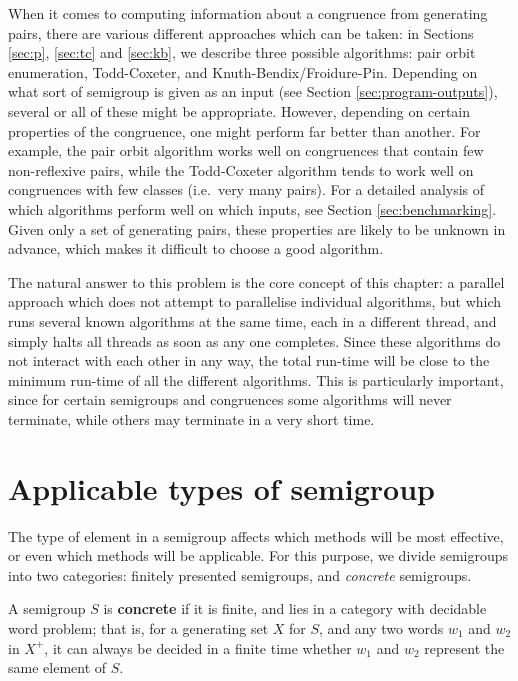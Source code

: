 When it comes to computing information about a congruence from generating pairs,
there are various different approaches which can be taken: in Sections
\ref{sec:p}, \ref{sec:tc} and \ref{sec:kb}, we describe three possible
algorithms: pair orbit enumeration, Todd-Coxeter, and Knuth-Bendix/Froidure-Pin.
Depending on what sort of semigroup is given as an input (see Section
\ref{sec:program-outputs}), several
or all of these might be appropriate.  However, depending on certain properties
of the congruence, one might perform far better than another.  For example, the
pair orbit algorithm works well on congruences that contain few non-reflexive
pairs, while the Todd-Coxeter algorithm tends to work well on congruences with
few classes (i.e.~very many pairs).  For a detailed analysis of which algorithms
perform well on which inputs, see Section \ref{sec:benchmarking}.  Given
only a set of generating pairs, these properties are likely to be unknown in
advance, which makes it difficult to choose a good algorithm.

The natural answer to this problem is the core concept of this chapter: a
parallel approach which does not attempt to parallelise individual algorithms,
but which runs several known algorithms at the same time, each in a different
thread, and simply halts all threads as soon as any one completes.  Since these
algorithms do not interact with each other in any way, the total run-time will
be close to the minimum run-time of all the different algorithms.  This is
particularly important, since for certain semigroups and congruences some
algorithms will never terminate, while others may terminate in a very short
time.

\section{Applicable types of semigroup}
\label{sec:applicable-types-of-semigroup}

The type of element in a semigroup affects which methods will be most effective,
or even which methods will be applicable.  For this purpose, we divide
semigroups into two categories: finitely presented semigroups, and
\textit{concrete} semigroups.

\begin{definition}
  \label{def:concrete}
  A semigroup $S$ is \textbf{concrete} if it is finite, and lies in a category
  with decidable word problem; that is, for a generating set $X$ for $S$, and
  any two words $w_1$ and $w_2$ in $X^+$, it can always be decided in a finite
  time whether $w_1$ and $w_2$ represent the same element of $S$.
\end{definition}

